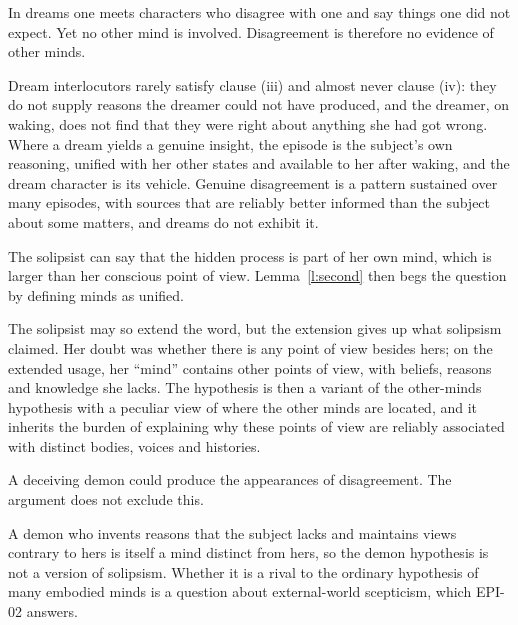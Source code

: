 \documentclass{situationist-preprint}
\begin{document}
\begin{objection}[Dreams]\label{o:dream}
In dreams one meets characters who disagree with one and say things one did not expect. Yet no other mind is involved. Disagreement is therefore no evidence of other minds.
\end{objection}

\begin{reply}
Dream interlocutors rarely satisfy clause (iii) and almost never clause (iv): they do not supply reasons the dreamer could not have produced, and the dreamer, on waking, does not find that they were right about anything she had got wrong. Where a dream yields a genuine insight, the episode is the subject's own reasoning, unified with her other states and available to her after waking, and the dream character is its vehicle. Genuine disagreement is a pattern sustained over many episodes, with sources that are reliably better informed than the subject about some matters, and dreams do not exhibit it.
\end{reply}

\begin{objection}\label{o:divided}
The solipsist can say that the hidden process is part of her own mind, which is larger than her conscious point of view. Lemma~\ref{l:second} then begs the question by defining minds as unified.
\end{objection}

\begin{reply}
The solipsist may so extend the word, but the extension gives up what solipsism claimed. Her doubt was whether there is any point of view besides hers; on the extended usage, her \enquote{mind} contains other points of view, with beliefs, reasons and knowledge she lacks. The hypothesis is then a variant of the other-minds hypothesis with a peculiar view of where the other minds are located, and it inherits the burden of explaining why these points of view are reliably associated with distinct bodies, voices and histories.
\end{reply}

\begin{objection}\label{o:demon}
A deceiving demon could produce the appearances of disagreement. The argument does not exclude this.
\end{objection}

\begin{reply}
A demon who invents reasons that the subject lacks and maintains views contrary to hers is itself a mind distinct from hers, so the demon hypothesis is not a version of solipsism. Whether it is a rival to the ordinary hypothesis of many embodied minds is a question about external-world scepticism, which EPI-02 answers.
\end{reply}
\end{document}
